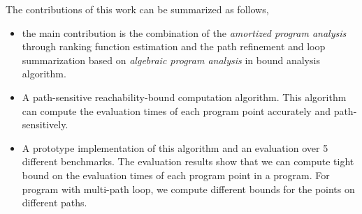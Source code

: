  The contributions of this work can be summarized as follows,
 \begin{itemize}
   \item the main contribution is the combination of the \emph{amortized program analysis} through ranking function estimation and the path refinement and loop summarization based on \emph{algebraic program analysis} in bound analysis algorithm.
    \item A path-sensitive reachability-bound computation algorithm.
    This algorithm can compute the evaluation times of each program point accurately and path-sensitively.
    \item A prototype implementation of this algorithm and an evaluation over 5 different benchmarks.
    The evaluation results show that we can compute tight bound on the evaluation times of each program point in a program. For program with multi-path loop, we compute different bounds for the points on different paths.
 \end{itemize}